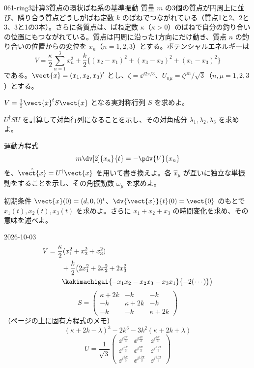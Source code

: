 \documentclass[uplatex,dvipdfmx,a4paper,11pt]{jsarticle}
\begin{document}
\begin{mondai}{061-ring3}{計算}{3質点の環状ばね系の基準振動}
質量 $m$ の3個の質点が円周上に並び、隣り合う質点どうしがばね定数 $k$ のばねでつながれている（質点1と2、2と3、3と1の3本）。さらに各質点は、ばね定数 $\kappa$（$\kappa>0$）のばねで自分の釣り合いの位置にもつながれている。質点は円周に沿った1方向にだけ動き、質点 $n$ の釣り合いの位置からの変位を $x_n$（$n=1,2,3$）とする。ポテンシャルエネルギーは
\[
V=\frac{\kappa}{2}\sum_{n=1}^{3}x_n^{2}+\frac{k}{2}\bigl\{(x_2-x_1)^{2}+(x_3-x_2)^{2}+(x_1-x_3)^{2}\bigr\}
\]
である。$\vect{x}=(x_1,x_2,x_3)^{t}$ とし、$\zeta=\ee^{\ii2\pi/3}$、$U_{n\mu}=\zeta^{\mu n}/\sqrt{3}$（$n,\mu=1,2,3$）とする。
\begin{shoumon}
  \item $V=\frac{1}{2}\vect{x}^{t}S\vect{x}$ となる実対称行列 $S$ を求めよ。
  \item $U^{\dagger}SU$ を計算して対角行列になることを示し、その対角成分 $\lambda_1,\lambda_2,\lambda_3$ を求めよ。
  \item 運動方程式
\[
m\dv[2]{x_n}{t}=-\pdv{V}{x_n}
\]
を、$\hat{\vect{x}}=U^{\dagger}\vect{x}$ を用いて書き換えよ。各 $\hat{x}_{\mu}$ が互いに独立な単振動をすることを示し、その角振動数 $\omega_{\mu}$ を求めよ。
  \item 初期条件 $\vect{x}(0)=(d,0,0)^{t}$、$\dv{\vect{x}}{t}(0)=\vect{0}$ のもとで $x_1(t),x_2(t),x_3(t)$ を求めよ。さらに $x_1+x_2+x_3$ の時間変化を求め、その意味を述べよ。
\end{shoumon}
\begin{kotaeutsushi}{2026-10-03}
\begin{align*}
  V&=\frac{\kappa}{2}(x_1^{2}+x_2^{2}+x_3^{2})\\
  &\qquad+\frac{k}{2}\bigl(2x_1^{2}+2x_2^{2}+2x_3^{2}\\
  &\qquad\kakimachigai{-x_1x_2-x_2x_3-x_3x_1}{-2(\cdots)}\bigr)
\end{align*}
\[
  S=\begin{pmatrix}\kappa+2k&-k&-k\\-k&\kappa+2k&-k\\-k&-k&\kappa+2k\end{pmatrix}
\]
（ページの上に固有方程式のメモ）
\[ (\kappa+2k-\lambda)^{3}-2k^{3}-3k^{2}(\kappa+2k+\lambda) \]
\[
  U=\frac{1}{\sqrt{3}}\begin{pmatrix}\ee^{\ii\frac{2\pi}{3}}&\ee^{\ii\frac{4\pi}{3}}&\ee^{\ii\frac{6\pi}{3}}\\[2pt]\ee^{\ii\frac{4\pi}{3}}&\ee^{\ii\frac{8\pi}{3}}&\ee^{\ii\frac{12\pi}{3}}\\[2pt]\ee^{\ii\frac{6\pi}{3}}&\ee^{\ii\frac{12\pi}{3}}&\ee^{\ii\frac{18\pi}{3}}\end{pmatrix}
\]
\end{kotaeutsushi}
\end{mondai}
\end{document}
